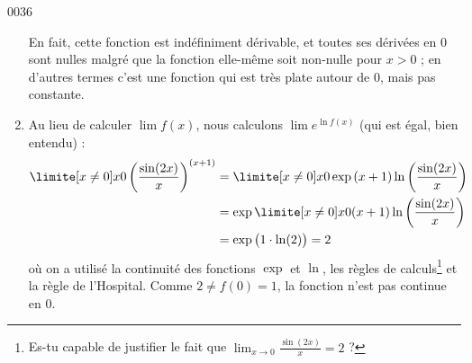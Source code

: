\begin{corrige}{0036}
\begin{enumerate}
En fait, cette fonction est indéfiniment dérivable, et toutes ses dérivées en $0$ sont nulles malgré que la fonction elle-même soit non-nulle pour $x > 0$ ; en d'autres termes c'est une fonction qui est très plate autour de $0$, mais pas constante.

\item
Au lieu de calculer $\lim f(x)$, nous calculons $\lim e^{\ln f(x) }$ (qui est égal, bien entendu) :
\begin{align*}
  \limite[x \neq 0] x 0 \left(\frac{\sin(2x)}{x}\right)^{(x+1)} &=
  \limite[x \neq 0] x 0 \exp{{(x+1)}
    \ln\left(\frac{\sin(2x)}{x}\right)}\\
  &= \exp{\limite[x \neq 0] x 0 {(x+1)}
    \ln\left(\frac{\sin(2x)}{x}\right)}\\
  &= \exp\big({1\cdot \ln(2)}\big) = 2
\end{align*}
où on a utilisé la continuité des fonctions $\exp{}$ et $\ln{}$, les règles de calculs\footnote{Es-tu capable de justifier le fait que $\lim_{x\to 0}\frac{ \sin(2x) }{ x }=2$ ?} et la règle de l'Hospital. Comme $2 \neq f(0) = 1$, la fonction n'est pas continue en $0$.


\end{enumerate}

\end{corrige}
